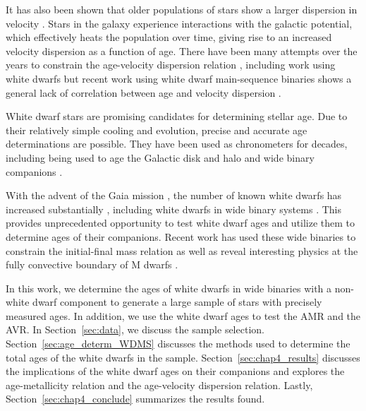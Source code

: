 \documentclass[twocolumn,linenumbers]{aastex631}
\begin{document}
It has also been shown that older populations of stars show a larger dispersion in velocity \citep[e.g.,][]{1974A&A....32..321M}. Stars in the galaxy experience interactions with the galactic potential, which effectively heats the population over time, giving rise to an increased velocity dispersion as a function of age. There have been many attempts over the years to constrain the age-velocity dispersion relation \citep[e.g.,][]{2009A&A...501..941H}, including work using white dwarfs \citep{2019ApJ...886..100C} but recent work using white dwarf main-sequence binaries shows a general lack of correlation between age and velocity dispersion \citep{2022A&A...658A..22R}.

White dwarf stars are promising candidates for determining stellar age. Due to their relatively simple cooling and evolution, precise and accurate age determinations are possible. They have been used as chronometers for decades, including being used to age the Galactic disk \citep{1987ApJ...315L..77W} and halo \citep{2019MNRAS.482..965K} and wide binary companions \citep{2019ApJ...870....9F, 2020ApJ...891..171Z}.

With the advent of the Gaia mission \citep{2016A&A...595A...1G,2018A&A...616A...1G,2021A&A...649A...1G}, the number of known white dwarfs has increased substantially \citep{2021MNRAS.508.3877G}, including white dwarfs in wide binary systems \citep{2018MNRAS.480.4884E, Tian, 2021MNRAS.506.2269E}. This provides unprecedented opportunity to test white dwarf ages and utilize them to determine ages of their companions. Recent work has used these wide binaries to constrain the initial-final mass relation \citep{2015ApJ...815...63A, 2024MNRAS.527.9061H} as well as reveal interesting physics at the fully convective boundary of M dwarfs \citep{2024arXiv240312129C}.

In this work, we determine the ages of white dwarfs in wide binaries with a non-white dwarf component to generate a large sample of stars with precisely measured ages. In addition, we use the white dwarf ages to test the AMR and the AVR. In Section~\ref{sec:data}, we discuss the sample selection. Section~\ref{sec:age_determ_WDMS} discusses the methods used to determine the total ages of the white dwarfs in the sample. Section~\ref{sec:chap4_results} discusses the implications of the white dwarf ages on their companions and explores the age-metallicity relation and the age-velocity dispersion relation. Lastly, Section~\ref{sec:chap4_conclude} summarizes the results found.
\end{document}
